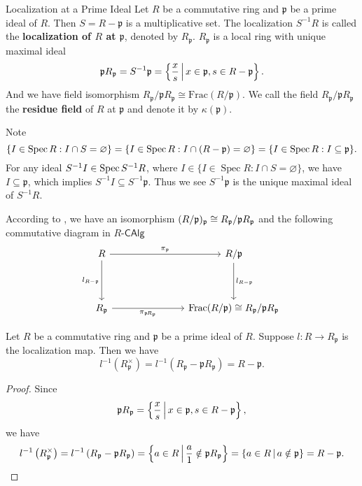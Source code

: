 \begin{definition}{Localization at a Prime Ideal}{}
    Let $R$ be a commutative ring and $\mathfrak{p}$ be a prime ideal of $R$. Then $S=R-\mathfrak{p}$ is a multiplicative set. The localization $S^{-1}R$ is called the \textbf{localization of $R$ at $\mathfrak{p}$}, denoted by $R_\mathfrak{p}$. $R_\mathfrak{p}$ is a local ring with unique maximal ideal 
    \[
    \mathfrak{p}R_\mathfrak{p}=S^{-1}\mathfrak{p}=\left\{\frac{x}{s}\,\middle\vert\, x\in \mathfrak{p}, s\in R-\mathfrak{p}\right\}.
    \]
    And we have field isomorphism $R_\mathfrak{p}/\mathfrak{p}R_\mathfrak{p}\cong \mathrm{Frac}(R/\mathfrak{p})$. We call the field $R_\mathfrak{p}/\mathfrak{p}R_\mathfrak{p}$ the \textbf{residue field} of $R$ at $\mathfrak{p}$ and denote it by $\kappa(\mathfrak{p})$.
\end{definition}

\begin{prf}
    Note
    \[
        \{I \in \operatorname{Spec} R: I \cap S=\varnothing\}=\{I \in \operatorname{Spec} R: I \cap (R-\frak{p})=\varnothing\}=\{I \in \operatorname{Spec} R: I\subseteq \frak{p}\}.
    \]
    For any ideal $S^{-1}I \in \operatorname{Spec} S^{-1}R$, where
    $I\in  \{I \in \operatorname{Spec} R: I \cap S=\varnothing\}$, we have $I\subseteq \mathfrak{p}$, which implies $S^{-1}I\subseteq  S^{-1}\mathfrak{p}$. Thus we see $S^{-1}\mathfrak{p}$ is the unique maximal ideal of $S^{-1}R$. 
    
    According to , we have an isomorphism $(R/\frak{p})_{\frak{p}}\cong R_\frak{p}/\frak{p}R_\frak{p}$ and the following commutative diagram in $R\text{-}\mathsf{CAlg}$ 
    \[
        \begin{tikzcd}
            R \arrow[r, "\pi_\mathfrak{p}"] \arrow[d, "l_{R-\mathfrak{p}}"'] &[+5em] R/\mathfrak{p} \arrow[d, "l_{R-\mathfrak{p}}"]              \\[+2em]
            R_\mathfrak{p} \arrow[r, "\pi_{\mathfrak{p}\hspace{-1pt}R_\mathfrak{p}}"']       & \mathrm{Frac}(R/\mathfrak{p})\cong R_\mathfrak{p}/\mathfrak{p} R_\mathfrak{p}
            \end{tikzcd}
    \]
\end{prf}

\begin{lemma}{}{}
    Let $R$ be a commutative ring and $\mathfrak{p}$ be a prime ideal of $R$. Suppose $l:R\to R_\mathfrak{p}$ is the localization map. Then we have
    \[
    l^{-1}\left(R_\mathfrak{p}^{\times}\right)=l^{-1}\left(R_\mathfrak{p}-\mathfrak{p} R_\mathfrak{p}\right)=R-\mathfrak{p}.
    \]
\end{lemma}
\begin{proof}
    Since \[
    \mathfrak{p}R_\mathfrak{p}=\left\{\frac{x}{s}\,\middle\vert\, x\in \mathfrak{p}, s\in R-\mathfrak{p}\right\},
    \]
    we have
    \[
    l^{-1}\left(R_\mathfrak{p}^{\times}\right)=l^{-1}\left(R_\mathfrak{p}-\mathfrak{p} R_\mathfrak{p}\right)=\left\{a\in R \,\middle\vert\, \frac{a}{1}\notin \mathfrak{p}R_\mathfrak{p}\right\}=\left\{a\in R\,\middle\vert\, a\notin \mathfrak{p}\right\}=R-\mathfrak{p}.
    \]
\end{proof}

